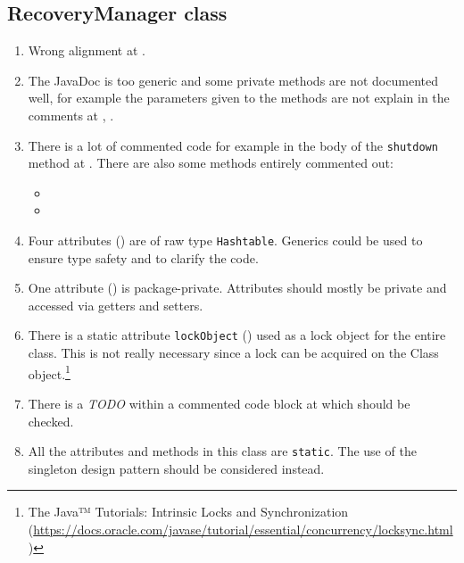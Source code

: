 \subsection{RecoveryManager class}
\label{sec:recoverymanager-class}

\begin{enumerate}
    \item {} Wrong alignment at .
    \item {} The JavaDoc is too generic and some private methods are not documented well, for example the parameters given to the methods are not explain in the comments at  , . %
	\item {} There is a lot of commented code for example in the body of the \texttt{shutdown} method at . There are also some methods entirely commented out:
	\begin{itemize}
		\item {}
		\item {}
	\end{itemize}
	\item {} Four attributes () are of raw type \texttt{Hashtable}. Generics could be used to ensure type safety and to clarify the code.
    \item {} One attribute () is package-private. Attributes should mostly be private and accessed via getters and setters.
    \item There is a static attribute \texttt{lockObject} () used as a lock object for the entire class. This is not really necessary since a lock can be acquired on the Class object.\footnote{The Java™ Tutorials: Intrinsic Locks and Synchronization (\url{https://docs.oracle.com/javase/tutorial/essential/concurrency/locksync.html})}
    \item There is a \emph{TODO} within a commented code block at  which should be checked.
    \item All the attributes and methods in this class are \texttt{static}. The use of the singleton design pattern should be considered instead.
\end{enumerate}

